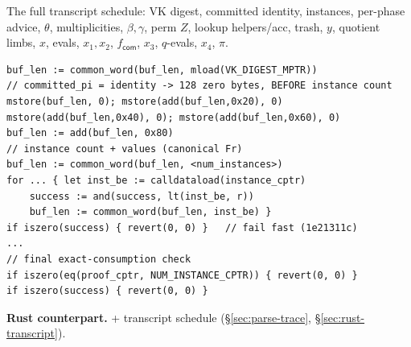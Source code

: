 The full transcript schedule: VK digest, committed identity, instances,
per-phase advice, $\theta$, multiplicities, $\beta,\gamma$, perm $Z$,
lookup helpers/acc, trash, $y$, quotient limbs, $x$, evals, $x_1,x_2$,
$f_{\mathsf{com}}$, $x_3$, $q$-evals, $x_4$, $\pi$.

\begin{lstlisting}[style=yul]
buf_len := common_word(buf_len, mload(VK_DIGEST_MPTR))
// committed_pi = identity -> 128 zero bytes, BEFORE instance count
mstore(buf_len, 0); mstore(add(buf_len,0x20), 0)
mstore(add(buf_len,0x40), 0); mstore(add(buf_len,0x60), 0)
buf_len := add(buf_len, 0x80)
// instance count + values (canonical Fr)
buf_len := common_word(buf_len, <num_instances>)
for ... { let inst_be := calldataload(instance_cptr)
    success := and(success, lt(inst_be, r))
    buf_len := common_word(buf_len, inst_be) }
if iszero(success) { revert(0, 0) }   // fail fast (1e21311c)
...
// final exact-consumption check
if iszero(eq(proof_cptr, NUM_INSTANCE_CPTR)) { revert(0, 0) }
if iszero(success) { revert(0, 0) }
\end{lstlisting}

\textbf{Rust counterpart.}  +
 transcript schedule
(\S\ref{sec:parse-trace}, \S\ref{sec:rust-transcript}).

